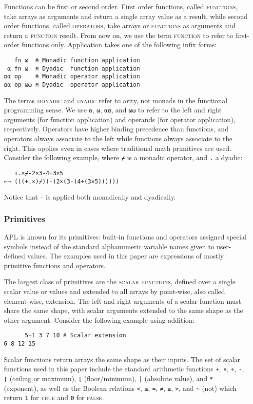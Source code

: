 \documentclass[10pt,twocolumn,english,format=sigplan,screen,balance]{acmart}
\newcommand{\noun}[1]{\textsc{#1}}
\begin{document}
Functions can be first or second order. First order functions, called
\noun{functions}, take arrays as arguments and return a single array
value as a result, while second order functions, called \noun{operators,
}take arrays or \noun{functions} as arguments and return a \noun{function
}result. From now on, we use the term \noun{function} to refer to
first-order functions only. Application takes one of the following
infix forms:
\begin{verbatim}
   fn ⍵  ⍝ Monadic function application
 ⍺ fn ⍵  ⍝ Dyadic  function application
⍺⍺ op    ⍝ Monadic operator application
⍺⍺ op ⍵⍵ ⍝ Dyadic  operator application
\end{verbatim}
The terms \noun{monadic} and \noun{dyadic} refer to arity, not monads
in the functional programming sense. We use \texttt{⍺}, \texttt{⍵},
\texttt{⍺⍺}, and \texttt{⍵⍵} to refer to the left and right arguments
(for function application) and operands (for operator application),
respectively. Operators have higher binding precedence than functions,
and operators always associate to the left while functions always
associate to the right. This applies even in cases where traditional
math primitives are used. Consider the following example, where \texttt{⌿}
is a monadic operator, and \texttt{.} a dyadic:
\begin{verbatim}
   +.×⌿-2×3-4+3×5
←→ (((+.×)⌿)(-(2×(3-(4+(3×5))))))
\end{verbatim}
Notice that \texttt{-} is applied both monadically and dyadically. 

\subsubsection{Primitives}

APL is known for its primitives: built-in functions and operators
assigned special symbols instead of the standard alphanumeric variable
names given to user-defined values. The examples used in this paper
are expressions of mostly primitive functions and operators.

The largest class of primitives are the \noun{scalar functions}, defined
over a single scalar value or values and extended to all arrays by
point-wise, also called element-wise, extension. The left and right
arguments of a scalar function must share the same shape, with scalar
arguments extended to the same shape as the other argument. Consider
the following example using addition:
\begin{verbatim}
      5+1 3 7 10 ⍝ Scalar extension
6 8 12 15
\end{verbatim}
Scalar functions return arrays the same shape as their inputs. The
set of scalar functions used in this paper include the standard arithmetic
functions \texttt{+}, \texttt{×}, \texttt{÷}, \texttt{-}, \texttt{⌈}
(ceiling or maximum), \texttt{⌊} (floor/minimum), \texttt{|} (absolute
value), and \texttt{{*}} (exponent), as well as the Boolean relations
\texttt{<}, \texttt{≤}, \texttt{=}, \texttt{≠}, \texttt{≥}, \texttt{>},
and \texttt{\textasciitilde} (not) which return \texttt{1} for \noun{true}
and \texttt{0} for \noun{false}.
\end{document}
